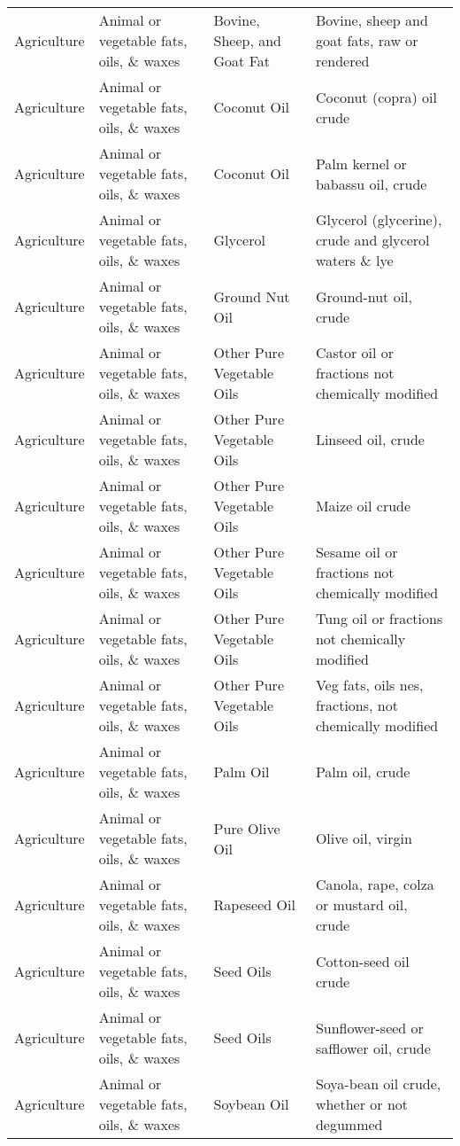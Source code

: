 \begin{appendices}
\begin{xltabular}{\textwidth}{|p{0.07\textwidth}|p{0.28\textwidth}|p{0.24\textwidth}|p{0.31\textwidth}|}
	\hline
	\endlastfoot
	Agriculture & Animal or vegetable fats, oils, \& waxes & Bovine, Sheep, and Goat Fat & Bovine, sheep and goat fats, raw or rendered \\
	Agriculture & Animal or vegetable fats, oils, \& waxes & Coconut Oil & Coconut (copra) oil crude \\
	Agriculture & Animal or vegetable fats, oils, \& waxes & Coconut Oil & Palm kernel or babassu oil, crude \\
	Agriculture & Animal or vegetable fats, oils, \& waxes & Glycerol & Glycerol (glycerine), crude and glycerol waters \& lye \\
	Agriculture & Animal or vegetable fats, oils, \& waxes & Ground Nut Oil & Ground-nut oil, crude \\
	Agriculture & Animal or vegetable fats, oils, \& waxes & Other Pure Vegetable Oils & Castor oil or fractions not chemically modified \\
	Agriculture & Animal or vegetable fats, oils, \& waxes & Other Pure Vegetable Oils & Linseed oil, crude \\
	Agriculture & Animal or vegetable fats, oils, \& waxes & Other Pure Vegetable Oils & Maize oil crude \\
	Agriculture & Animal or vegetable fats, oils, \& waxes & Other Pure Vegetable Oils & Sesame oil or fractions not chemically modified \\
	Agriculture & Animal or vegetable fats, oils, \& waxes & Other Pure Vegetable Oils & Tung oil or fractions not chemically modified \\
	Agriculture & Animal or vegetable fats, oils, \& waxes & Other Pure Vegetable Oils & Veg fats, oils nes, fractions, not chemically modified \\
	Agriculture & Animal or vegetable fats, oils, \& waxes & Palm Oil & Palm oil, crude \\
	Agriculture & Animal or vegetable fats, oils, \& waxes & Pure Olive Oil & Olive oil, virgin \\
	Agriculture & Animal or vegetable fats, oils, \& waxes & Rapeseed Oil & Canola, rape, colza or mustard oil, crude \\
	Agriculture & Animal or vegetable fats, oils, \& waxes & Seed Oils & Cotton-seed oil crude \\
	Agriculture & Animal or vegetable fats, oils, \& waxes & Seed Oils & Sunflower-seed or safflower oil, crude \\
	Agriculture & Animal or vegetable fats, oils, \& waxes & Soybean Oil & Soya-bean oil crude, whether or not degummed \\

\end{xltabular}
\end{appendices}
